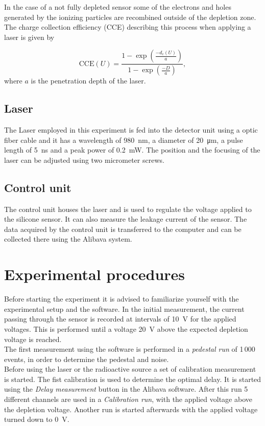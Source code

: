 In the case of a not fully depleted sensor some of the electrons and holes generated by the ionizing particles are recombined outside of the depletion zone. The charge collection efficiency (CCE) describing this process when applying a laser is given by 

\begin{equation}
	\mathrm{CCE}(U)=\frac{1-\exp\left(\frac{-d_{\mathrm{c}}(U)}{a}\right)}{1-\exp\left(\frac{-D}{a}\right)},
\end{equation}
where $a$ is the penetration depth of the laser.

\subsection{Laser}
The Laser employed in this experiment is fed into the detector unit using a optic fiber cable and it has a wavelength of \qty{980}{\nano\meter}, a diameter of \qty{20}{\micro\meter}, a pulse length of \qty{5}{\nano\second} and a peak power of \qty{0.2}{\milli\watt}. The position and the focusing of the laser can be adjusted using two micrometer screws.
\subsection{Control unit}
The control unit houses the laser and is used to regulate the voltage applied to the silicone sensor. It can also measure the leakage current of the sensor. The data acquired by the control unit is transferred to the computer and can be collected there using the Alibava system.

\section{Experimental procedures}
\label{sec:exec}
Before starting the experiment it is advised to familiarize yourself with the experimental setup and the software. In the initial measurement, the current passing through the sensor is recorded at intervals of \qty{10}{\volt} for the applied voltages. This is performed until a voltage \qty{20}{\volt} above the expected depletion voltage is reached.\\

The first measurement using the software is performed in a \textit{pedestal run} of 1\,000 events, in order to determine the pedestal and noise.\\

Before using the laser or the radioactive source a set of calibration measurement is started. The fist calibration is used to determine the optimal delay. It is started using the \textit{Delay measurement} button in the Alibava software. After this run 5 different channels are used in a \textit{Calibration run}, with the applied voltage above the depletion voltage. Another run is started afterwards with the applied voltage turned down to \qty{0}{\volt}.\\

